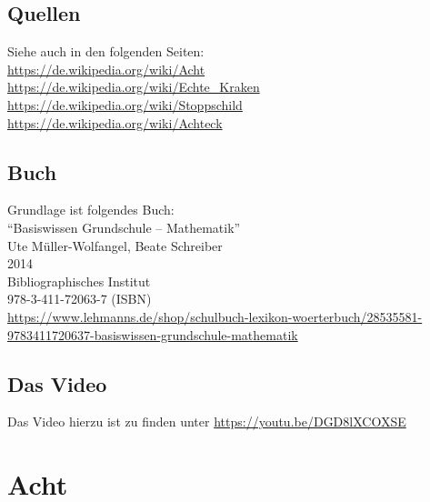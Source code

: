 \documentclass[a4paper]{amsart}
\theoremstyle{definition}
\begin{document}
\subsection*{Quellen}
Siehe auch in den folgenden Seiten:\\
\url{https://de.wikipedia.org/wiki/Acht}\\
\url{https://de.wikipedia.org/wiki/Echte_Kraken}\\
\url{https://de.wikipedia.org/wiki/Stoppschild}\\
\url{https://de.wikipedia.org/wiki/Achteck}

\subsection*{Buch}
Grundlage ist folgendes Buch:\\
"`Basiswissen Grundschule – Mathematik"'\\
Ute Müller-Wolfangel, Beate Schreiber\\
2014\\
Bibliographisches Institut\\
978-3-411-72063-7 (ISBN)
\\
\url{https://www.lehmanns.de/shop/schulbuch-lexikon-woerterbuch/28535581-9783411720637-basiswissen-grundschule-mathematik}

\subsection*{Das Video}
Das Video hierzu ist zu finden unter \url{https://youtu.be/DGD8lXCOXSE}

\section{Acht}
\def\kategoryVspace{5pt}
\end{document}
